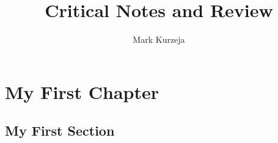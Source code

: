 \documentclass[10pt,letterpaper]{report}
\title{Critical Notes and Review}
\author{Mark Kurzeja}
\begin{document}
\maketitle
\chapter{My First Chapter}
\section{My First Section}
\end{document}
